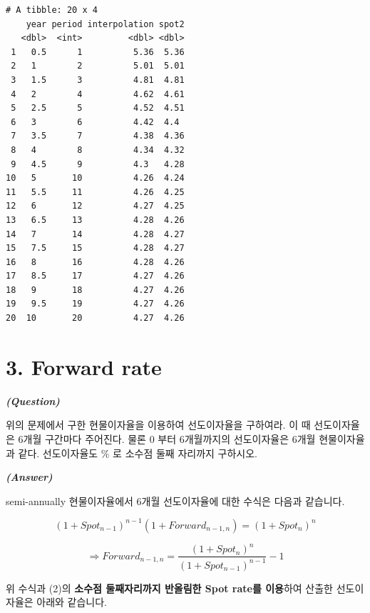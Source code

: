 \documentclass[
  a4paper,
  DIV=11,
  numbers=noendperiod]{scrreprt}
\begin{document}
\begin{verbatim}
# A tibble: 20 x 4
    year period interpolation spot2
   <dbl>  <int>         <dbl> <dbl>
 1   0.5      1          5.36  5.36
 2   1        2          5.01  5.01
 3   1.5      3          4.81  4.81
 4   2        4          4.62  4.61
 5   2.5      5          4.52  4.51
 6   3        6          4.42  4.4 
 7   3.5      7          4.38  4.36
 8   4        8          4.34  4.32
 9   4.5      9          4.3   4.28
10   5       10          4.26  4.24
11   5.5     11          4.26  4.25
12   6       12          4.27  4.25
13   6.5     13          4.28  4.26
14   7       14          4.28  4.27
15   7.5     15          4.28  4.27
16   8       16          4.28  4.26
17   8.5     17          4.27  4.26
18   9       18          4.27  4.26
19   9.5     19          4.27  4.26
20  10       20          4.27  4.26
\end{verbatim}

\section*{3. Forward rate}\label{forward-rate}


\textbf{\emph{(Question)}}

위의 문제에서 구한 현물이자율을 이용하여 선도이자율을 구하여라. 이 때
선도이자율은 6개월 구간마다 주어진다. 물론 0 부터 6개월까지의
선도이자율은 6개월 현물이자율과 같다. 선도이자율도 \% 로 소수점 둘째
자리까지 구하시오.

\textbf{\emph{(Answer)}}

semi-annually 현물이자율에서 6개월 선도이자율에 대한 수식은 다음과
같습니다.

\[(1+Spot_{n-1})^{n-1}(1+Forward_{n-1,n})=(1+Spot_n)^n\]

\[\Rightarrow Forward_{n-1,n}=\frac{(1+Spot_n)^n}{(1+Spot_{n-1})^{n-1}}-1\]

위 수식과 (2)의 \textbf{소수점 둘째자리까지 반올림한 Spot rate를
이용}하여 산출한 선도이자율은 아래와 같습니다.
\end{document}
